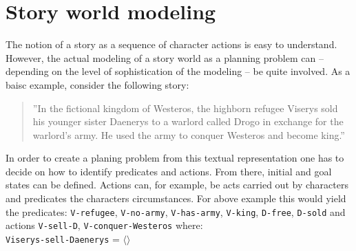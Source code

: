 \section{Story world modeling}\label{modeling}
The notion of a story as a sequence of character actions is easy to understand. However, the actual modeling of a story world as a planning problem can -- depending on the level of sophistication of the modeling -- be quite involved. As a baisc example, consider the following story:
\begin{quote}
''In the fictional kingdom of Westeros, the highborn refugee Viserys sold his younger sister Daenerys to a warlord called Drogo in exchange for the warlord's army. He used the army to conquer Westeros and become king.''
\end{quote}
In order to create a planing problem from this textual representation one has to decide on how to identify predicates and actions. From there, initial and goal states can be defined. Actions can, for example, be acts carried out by characters and predicates the characters circumstances. For above example this would yield the predicates: \texttt{V-refugee}, \texttt{V-no-army}, \texttt{V-has-army}, \texttt{V-king}, \texttt{D-free}, \texttt{D-sold} and actions \texttt{V-sell-D}, \texttt{V-conquer-Westeros} where:\\
\texttt{Viserys-sell-Daenerys} = $\langle\rangle$
%
%
